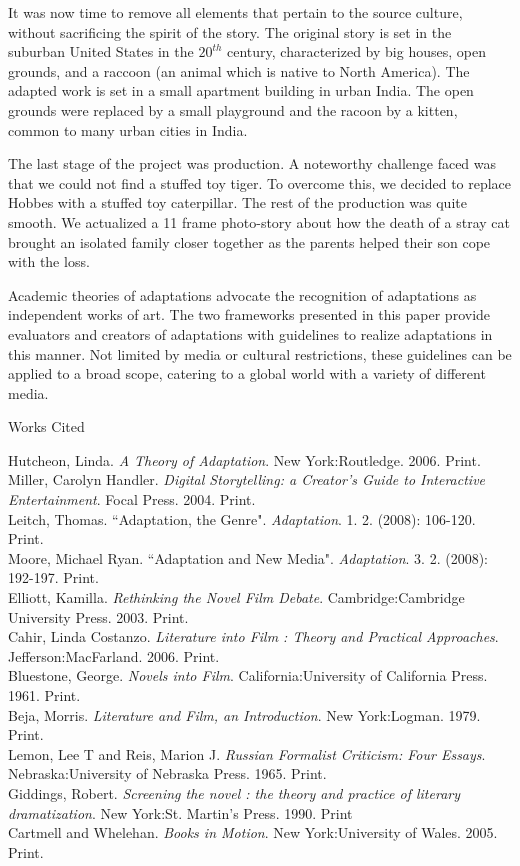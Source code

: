 \documentclass[12pt]{article}
\newenvironment{workscited}{\newpage \begin{center} Works Cited \end{center}}{\newpage }
\begin{document}
It was now time to remove all elements that pertain to
the source culture, without sacrificing the spirit of the story. The original
story is set in the suburban United States in the $20^{th}$ century,
characterized by big houses, open grounds, and a raccoon (an animal which is
native to North America). The adapted work is set in a small apartment building in
urban India. The open grounds were replaced by a small playground and the
racoon by a kitten, common to many urban cities in India.

The last stage of the project was production. A noteworthy challenge faced
was that we could not find a stuffed toy tiger. To overcome
this, we decided to replace Hobbes with a stuffed toy caterpillar. The rest of the production
was quite smooth. We actualized a 11 frame photo-story about how the
death of a stray cat brought an isolated family closer together as the parents helped their
son cope with the loss.

Academic theories of adaptations advocate the recognition of adaptations as
independent works of art. The two frameworks presented in this paper
provide evaluators and creators of adaptations with guidelines to realize
adaptations in this manner. Not limited by media or cultural
restrictions, these guidelines can be applied to a broad scope, catering to a
global world with a variety of different media.


\begin{workscited}
Hutcheon, Linda. \textit{A Theory of Adaptation}. New York:Routledge. 2006. Print.\\
Miller, Carolyn Handler. \textit{Digital Storytelling: a Creator's Guide to Interactive
Entertainment}. Focal Press. 2004. Print.\\
Leitch, Thomas. ``Adaptation, the Genre". \textit{Adaptation}. 1. 2. (2008):
106-120. Print. \\
Moore, Michael Ryan. ``Adaptation and New Media". \textit{Adaptation}. 3. 2. (2008):
192-197. Print. \\
Elliott, Kamilla. \textit{Rethinking the Novel Film Debate}. Cambridge:Cambridge
University Press. 2003. Print.\\
Cahir, Linda Costanzo. \textit{Literature into Film : Theory and Practical
Approaches}. Jefferson:MacFarland. 2006. Print. \\
Bluestone, George. \textit{Novels into Film}. California:University of California Press.
1961. Print.\\
Beja, Morris. \textit{Literature and Film, an Introduction}. New York:Logman. 1979.
Print. \\
Lemon, Lee T and Reis, Marion J. \textit{Russian Formalist Criticism: Four
Essays}. Nebraska:University of Nebraska Press. 1965. Print.\\
Giddings, Robert. \textit{Screening the novel : the theory and practice of literary
dramatization}. New York:St. Martin's Press. 1990. Print \\
Cartmell and Whelehan. \textit{Books in Motion}. New York:University of Wales. 2005. Print.
\end{workscited}
\end{document}
